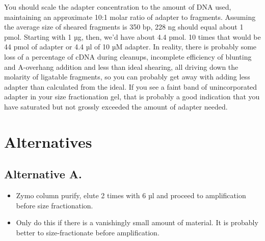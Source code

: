 \documentclass[
  letterpaper,
  DIV=11,
  numbers=noendperiod]{scrreprt}
\providecommand{\tightlist}{%
  \setlength{\itemsep}{0pt}\setlength{\parskip}{0pt}}\usepackage{longtable,booktabs,array}
\begin{document}
\begin{tcolorbox}[enhanced jigsaw, toprule=.15mm, breakable, coltitle=black, leftrule=.75mm, title=\textcolor{quarto-callout-warning-color}{\faExclamationTriangle}\hspace{0.5em}{NOTES}, bottomrule=.15mm, toptitle=1mm, bottomtitle=1mm, colframe=quarto-callout-warning-color-frame, opacityback=0, colback=white, opacitybacktitle=0.6, colbacktitle=quarto-callout-warning-color!10!white, rightrule=.15mm, titlerule=0mm, arc=.35mm, left=2mm]

You should scale the adapter concentration to the amount of DNA used,
maintaining an approximate 10:1 molar ratio of adapter to fragments.
Assuming the average size of sheared fragments is 350 bp, 228 ng should
equal about 1 pmol. Starting with 1 µg, then, we'd have about 4.4 pmol.
10 times that would be 44 pmol of adapter or 4.4 µl of 10 µM adapter. In
reality, there is probably some loss of a percentage of cDNA during
cleanups, incomplete efficiency of blunting and A-overhang addition and
less than ideal shearing, all driving down the molarity of ligatable
fragments, so you can probably get away with adding less adapter than
calculated from the ideal. If you see a faint band of unincorporated
adapter in your size fractionation gel, that is probably a good
indication that you have saturated but not grossly exceeded the amount
of adapter needed.

\end{tcolorbox}

\hypertarget{alternatives}{%
\section{Alternatives}\label{alternatives}}

\hypertarget{alternative-a.}{%
\subsection{Alternative A.}\label{alternative-a.}}

\begin{itemize}
\tightlist
\item
  Zymo column purify, elute 2 times with 6 µl and proceed to
  amplification before size fractionation.
\item
  Only do this if there is a vanishingly small amount of material. It is
  probably better to size-fractionate before amplification.
\end{itemize}
\end{document}
